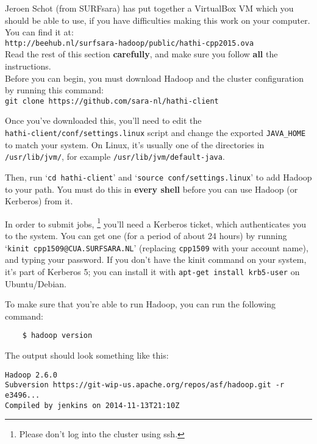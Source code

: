 \documentclass[a4paper,11pt]{article}
\begin{document}
  Jeroen Schot (from SURFsara) has put together a VirtualBox VM which you should be able to use, if you have difficulties making this work on your computer.
  You can find it at: \\ \texttt{http://beehub.nl/surfsara-hadoop/public/hathi-cpp2015.ova} \\

  Read the rest of this section \textbf{carefully}, and make sure you follow \textbf{all} the instructions. \\

  Before you can begin, you must download Hadoop and the cluster configuration by running this command:\\
  \texttt{git clone https://github.com/sara-nl/hathi-client}

  Once you've downloaded this, you'll need to edit the \\ \texttt{hathi-client/conf/settings.linux} script
  and change the exported \texttt{JAVA\_HOME} to match your system. On Linux, it's usually one of the directories in \texttt{/usr/lib/jvm/},
  for example \texttt{/usr/lib/jvm/default-java}.

  Then, run `\texttt{cd hathi-client}' and `\texttt{source conf/settings.linux}' to add Hadoop
  to your path. You must do this in \textbf{every shell} before you can use Hadoop (or Kerberos) from it.
  
  In order to submit jobs,
  \footnote{Please don't log into the cluster using ssh.}
  you'll need a Kerberos ticket, which authenticates you to the system. You can get one (for a period of about 24 hours) by running
  `\texttt{kinit cpp1509@CUA.SURFSARA.NL}' (replacing \texttt{cpp1509} with your account name), and typing your password. If you don't have the kinit
  command on your system, it's part of Kerberos 5; you can install it with \texttt{apt-get install krb5-user} on Ubuntu/Debian.

  To make sure that you're able to run Hadoop, you can run the following command: 
  
  \lstset{language=}
  
  \begin{lstlisting}
    $ hadoop version
  \end{lstlisting}
  
  The output should look something like this: 
  \begin{lstlisting}
Hadoop 2.6.0
Subversion https://git-wip-us.apache.org/repos/asf/hadoop.git -r e3496...
Compiled by jenkins on 2014-11-13T21:10Z
  \end{lstlisting}
\end{document}

